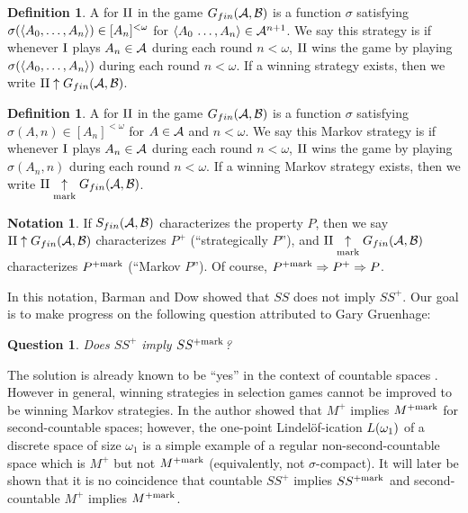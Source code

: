 \documentclass{amsart}
\theoremstyle{plain}
\newtheorem{question}[theorem]{Question}
\theoremstyle{definition}
\newtheorem{definition}[theorem]{Definition}
\newtheorem{notation}[theorem]{Notation}
\theoremstyle{remark}
\theoremstyle{plain}
\theoremstyle{definition}
\theoremstyle{remark}
\begin{document}
\begin{definition}
  A  for \(\mathrm{II}\) in the game \(G_{fin}(\mathcal{A},\mathcal{B})\)
  is a function \(\sigma\) satisfying
  \(\sigma(\langle A_0,\dots,A_n\rangle)\in[A_n]^{<\omega}\) for
  \(\langle A_0\,\dots,A_n\rangle\in\mathcal{A}^{n+1}\). We say this strategy is
   if whenever \(\mathrm{I}\) plays \(A_n\in\mathcal{A}\) during each
  round \(n<\omega\), \(\mathrm{II}\) wins the game by playing
  \(\sigma(\langle A_0,\dots,A_n\rangle)\) during each round \(n<\omega\).
  If a winning strategy exists, then we write
  \(\mathrm{II}\uparrow G_{fin}(\mathcal{A},\mathcal{B})\).
\end{definition}

\begin{definition}
  A  for \(\mathrm{II}\) in the game
  \(G_{fin}(\mathcal{A},\mathcal{B})\)
  is a function \(\sigma\) satisfying
  \(\sigma(A,n)\in[A_n]^{<\omega}\) for
  \(A\in\mathcal{A}\) and \(n<\omega\). We say this Markov strategy is
   if whenever \(\mathrm{I}\) plays \(A_n\in\mathcal{A}\) during each
  round \(n<\omega\), \(\mathrm{II}\) wins the game by playing
  \(\sigma(A_n,n)\) during each round \(n<\omega\).
  If a winning Markov strategy exists, then we write
  \(\mathrm{II}\underset{\text{mark}}{\uparrow}G_{fin}(\mathcal{A},\mathcal{B})\).
\end{definition}

\begin{notation}
  If \(S_{fin}(\mathcal{A},\mathcal{B})\) characterizes the property \(P\),
  then we say \(\mathrm{II}\uparrow G_{fin}(\mathcal{A},\mathcal{B})\) characterizes
  \(P^+\) (``strategically \(P\)''), and
  \(\mathrm{II}\underset{\text{mark}}{\uparrow}G_{fin}(\mathcal{A},\mathcal{B})\) characterizes
  \(P^{+\mathrm{mark}}\) (``Markov \(P\)'').
  Of course, \(P^{+\mathrm{mark}}\Rightarrow P^+ \Rightarrow P\).
\end{notation}

In this notation,
Barman and Dow showed that \(SS\) does not imply
\(SS^+\). Our goal is to make progress on the following question
attributed to Gary Gruenhage:

\begin{question}\label{mainQuestion}
  Does \(SS^+\) imply \(SS^{+\mathrm{mark}}\)?
\end{question}

The solution is already known to be ``yes'' in the context of countable spaces
\cite{MR2678950}. However in general, winning strategies in selection games
cannot be improved to be winning Markov strategies. In
\cite{clontzMengerCMUC} the author showed that \(M^+\) implies
\(M^{+\mathrm{mark}}\) for second-countable spaces; however, the one-point
Lindel\"of-ication \(L(\omega_1)\) of a discrete space of size
\(\omega_1\) is a simple
example of a regular non-second-countable space which is
\(M^+\) but not \(M^{+\mathrm{mark}}\) (equivalently, not \(\sigma\)-compact).
It will later be shown that it is no coincidence
that countable \(SS^+\) implies \(SS^{+\mathrm{mark}}\) and
second-countable \(M^+\) implies \(M^{+\mathrm{mark}}\).
\end{document}
